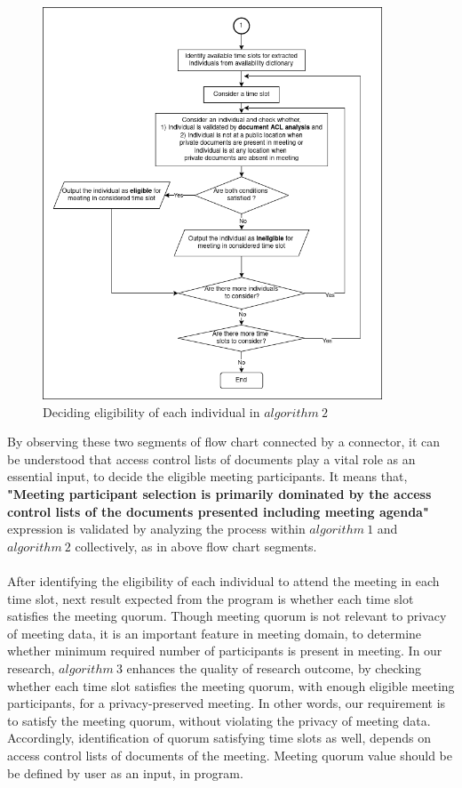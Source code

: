 \begin{figure}[H]
    \centering
    \includegraphics[width=0.9\textwidth]{./image/algo02_result_analysis.png}
    \caption{Deciding eligibility of each individual in $algorithm\ 2$}
    \label{fig:Deciding eligibility of each individual in algorithm 2}
\end{figure}
By observing these two segments of flow chart connected by a connector, it can be understood that access control lists of documents play a vital role as an essential input, to decide the eligible meeting participants. It means that, \textbf{"Meeting participant selection is primarily dominated by the access control lists of the documents presented including meeting agenda"} expression is validated by analyzing the process within $algorithm\ 1$ and $algorithm\ 2$ collectively, as in above flow chart segments.\\ \\ 
After identifying the eligibility of each individual to attend the meeting in each time slot, next result expected from the program is whether each time slot satisfies the meeting quorum. Though meeting quorum is not relevant to privacy of meeting data, it is an important feature in meeting domain, to determine whether minimum required number of participants is present in meeting. In our research, $algorithm\ 3$ enhances the quality of research outcome, by checking whether each time slot satisfies the meeting quorum, with enough eligible meeting participants, for a privacy-preserved meeting. In other words, our requirement is to satisfy the meeting quorum, without violating the privacy of meeting data. Accordingly, identification of quorum satisfying time slots as well, depends on access control lists of documents of the meeting. Meeting quorum value should be be defined by user as an input, in program.\\ \\
